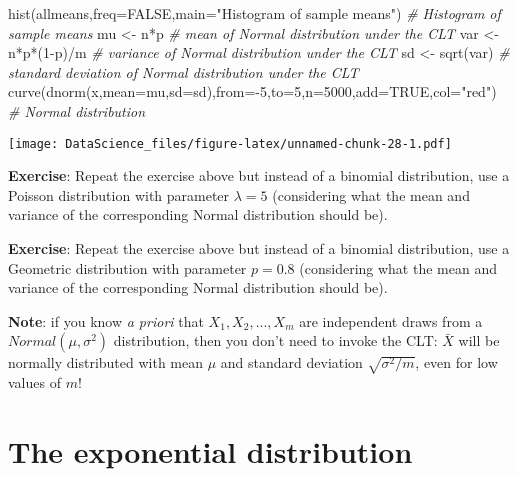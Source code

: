 \documentclass[
]{book}
\newenvironment{Shaded}{\begin{snugshade}}{\end{snugshade}}
\newcommand{\AttributeTok}[1]{\textcolor[rgb]{0.77,0.63,0.00}{#1}}
\newcommand{\CommentTok}[1]{\textcolor[rgb]{0.56,0.35,0.01}{\textit{#1}}}
\newcommand{\ConstantTok}[1]{\textcolor[rgb]{0.00,0.00,0.00}{#1}}
\newcommand{\DecValTok}[1]{\textcolor[rgb]{0.00,0.00,0.81}{#1}}
\newcommand{\FunctionTok}[1]{\textcolor[rgb]{0.00,0.00,0.00}{#1}}
\newcommand{\NormalTok}[1]{#1}
\newcommand{\OtherTok}[1]{\textcolor[rgb]{0.56,0.35,0.01}{#1}}
\newcommand{\SpecialCharTok}[1]{\textcolor[rgb]{0.00,0.00,0.00}{#1}}
\newcommand{\StringTok}[1]{\textcolor[rgb]{0.31,0.60,0.02}{#1}}
\begin{document}
\begin{Shaded}
\begin{Highlighting}[]
\FunctionTok{hist}\NormalTok{(allmeans,}\AttributeTok{freq=}\ConstantTok{FALSE}\NormalTok{,}\AttributeTok{main=}\StringTok{"Histogram of sample means"}\NormalTok{) }\CommentTok{\# Histogram of sample means}
\NormalTok{mu }\OtherTok{\textless{}{-}}\NormalTok{ n}\SpecialCharTok{*}\NormalTok{p }\CommentTok{\# mean of Normal distribution under the CLT}
\NormalTok{var }\OtherTok{\textless{}{-}}\NormalTok{ n}\SpecialCharTok{*}\NormalTok{p}\SpecialCharTok{*}\NormalTok{(}\DecValTok{1}\SpecialCharTok{{-}}\NormalTok{p)}\SpecialCharTok{/}\NormalTok{m }\CommentTok{\# variance of Normal distribution under the CLT}
\NormalTok{sd }\OtherTok{\textless{}{-}} \FunctionTok{sqrt}\NormalTok{(var) }\CommentTok{\# standard deviation of Normal distribution under the CLT}
\FunctionTok{curve}\NormalTok{(}\FunctionTok{dnorm}\NormalTok{(x,}\AttributeTok{mean=}\NormalTok{mu,}\AttributeTok{sd=}\NormalTok{sd),}\AttributeTok{from=}\SpecialCharTok{{-}}\DecValTok{5}\NormalTok{,}\AttributeTok{to=}\DecValTok{5}\NormalTok{,}\AttributeTok{n=}\DecValTok{5000}\NormalTok{,}\AttributeTok{add=}\ConstantTok{TRUE}\NormalTok{,}\AttributeTok{col=}\StringTok{"red"}\NormalTok{) }\CommentTok{\# Normal distribution}
\end{Highlighting}
\end{Shaded}

\texttt{[image: DataScience\_files/figure-latex/unnamed-chunk-28-1.pdf]}

\textbf{Exercise}: Repeat the exercise above but instead of a binomial
distribution, use a Poisson distribution with parameter \(\lambda=5\) (considering what the mean and variance of the corresponding Normal distribution should be).

\textbf{Exercise}: Repeat the exercise above but instead of a binomial distribution, use a Geometric distribution with parameter \(p=0.8\) (considering what the mean and variance of the corresponding Normal distribution should be).

\textbf{Note}: if you know \emph{a priori} that \(X_1, X_2, ..., X_m\) are independent draws from a \(Normal(\mu,\sigma^2)\) distribution, then you don't need to invoke the CLT: \(\bar{X}\) will be normally distributed with mean \(\mu\) and standard deviation \(\sqrt{\sigma^2 /m}\), even for low values of \(m\)!

\hypertarget{the-exponential-distribution}{%
\section{The exponential distribution}\label{the-exponential-distribution}}
\end{document}
